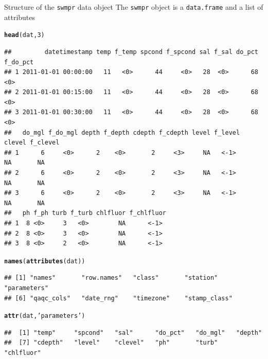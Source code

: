 \documentclass[xcolor=dvipsnames]{beamer}\usepackage[]{graphicx}\usepackage[]{color}
\makeatletter
\newcommand{\hlnum}[1]{\textcolor[rgb]{0.686,0.059,0.569}{#1}}%
\newcommand{\hlstr}[1]{\textcolor[rgb]{0.192,0.494,0.8}{#1}}%
\newcommand{\hlstd}[1]{\textcolor[rgb]{0.345,0.345,0.345}{#1}}%
\newcommand{\hlkwd}[1]{\textcolor[rgb]{0.737,0.353,0.396}{\textbf{#1}}}%
\newenvironment{kframe}{%
 \def\at@end@of@kframe{}%
 \ifinner\ifhmode%
  \def\at@end@of@kframe{\end{minipage}}%
  \begin{minipage}{\columnwidth}%
 \fi\fi%
 \def\FrameCommand##1{\hskip\@totalleftmargin \hskip-\fboxsep
 \colorbox{shadecolor}{##1}\hskip-\fboxsep
     \hskip-\linewidth \hskip-\@totalleftmargin \hskip\columnwidth}%
 \MakeFramed {\advance\hsize-\width
   \@totalleftmargin\z@ \linewidth\hsize
   \@setminipage}}%
 {\par\unskip\endMakeFramed%
 \at@end@of@kframe}
\newenvironment{knitrout}{}{} %
\makeatother
\begin{document}
\begin{frame}{Structure of the \texttt{swmpr} data object}
The \texttt{swmpr} object is a \texttt{data.frame} and a list of attributes 
\begin{knitrout}\scriptsize
{}\color{fgcolor}\begin{kframe}
\begin{alltt}
\hlkwd{head}\hlstd{(dat,} \hlnum{3}\hlstd{)}
\end{alltt}
\begin{verbatim}
##         datetimestamp temp f_temp spcond f_spcond sal f_sal do_pct f_do_pct
## 1 2011-01-01 00:00:00   11   <0>      44     <0>   28  <0>      68     <0> 
## 2 2011-01-01 00:15:00   11   <0>      44     <0>   28  <0>      68     <0> 
## 3 2011-01-01 00:30:00   11   <0>      44     <0>   28  <0>      68     <0> 
##   do_mgl f_do_mgl depth f_depth cdepth f_cdepth level f_level clevel f_clevel
## 1      6     <0>      2    <0>       2     <3>     NA   <-1>      NA       NA
## 2      6     <0>      2    <0>       2     <3>     NA   <-1>      NA       NA
## 3      6     <0>      2    <0>       2     <3>     NA   <-1>      NA       NA
##   ph f_ph turb f_turb chlfluor f_chlfluor
## 1  8 <0>     3   <0>        NA      <-1> 
## 2  8 <0>     3   <0>        NA      <-1> 
## 3  8 <0>     2   <0>        NA      <-1>
\end{verbatim}
\begin{alltt}
\hlkwd{names}\hlstd{(}\hlkwd{attributes}\hlstd{(dat))}
\end{alltt}
\begin{verbatim}
## [1] "names"       "row.names"   "class"       "station"     "parameters" 
## [6] "qaqc_cols"   "date_rng"    "timezone"    "stamp_class"
\end{verbatim}
\begin{alltt}
\hlkwd{attr}\hlstd{(dat,} \hlstr{'parameters'}\hlstd{)}
\end{alltt}
\begin{verbatim}
##  [1] "temp"     "spcond"   "sal"      "do_pct"   "do_mgl"   "depth"   
##  [7] "cdepth"   "level"    "clevel"   "ph"       "turb"     "chlfluor"
\end{verbatim}
\end{kframe}
\end{knitrout}
\end{frame}
\end{document}
